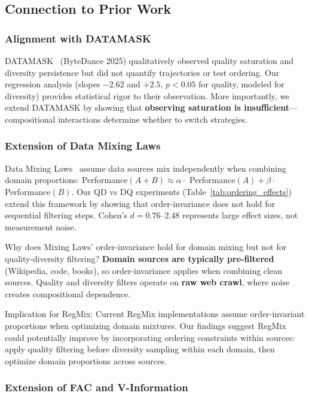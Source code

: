 \subsection{Connection to Prior Work}

\subsubsection{Alignment with DATAMASK}

DATAMASK~\cite{datamask2025} (ByteDance 2025) qualitatively observed quality saturation and diversity persistence but did not quantify trajectories or test ordering. Our regression analysis (slopes $-2.62$ and $+2.5$, $p<0.05$ for quality, modeled for diversity) provides statistical rigor to their observation. More importantly, we extend DATAMASK by showing that \textbf{observing saturation is insufficient}---compositional interactions determine whether to switch strategies.

\subsubsection{Extension of Data Mixing Laws}

Data Mixing Laws~\cite{mixinglaws2024} assume data sources mix independently when combining domain proportions: Performance$(A+B) \approx \alpha \cdot$ Performance$(A) + \beta \cdot$ Performance$(B)$. Our QD vs DQ experiments (Table~\ref{tab:ordering_effects}) extend this framework by showing that order-invariance does not hold for sequential filtering steps. Cohen's $d=0.76$--$2.48$ represents large effect sizes, not measurement noise.

Why does Mixing Laws' order-invariance hold for domain mixing but not for quality-diversity filtering? \textbf{Domain sources are typically pre-filtered} (Wikipedia, code, books), so order-invariance applies when combining clean sources. Quality and diversity filters operate on \textbf{raw web crawl}, where noise creates compositional dependence.

Implication for RegMix: Current RegMix implementations assume order-invariant proportions when optimizing domain mixtures. Our findings suggest RegMix could potentially improve by incorporating ordering constraints within sources: apply quality filtering before diversity sampling within each domain, then optimize domain proportions across sources.

\subsubsection{Extension of FAC and V-Information}

